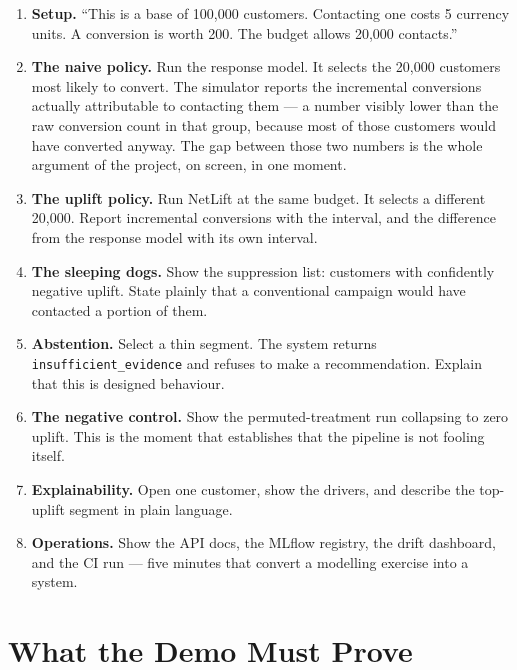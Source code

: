 \documentclass[11pt,a4paper]{article}
\begin{document}
\begin{enumerate}
\item \textbf{Setup.} ``This is a base of 100{,}000 customers. Contacting one costs 5 currency
units. A conversion is worth 200. The budget allows 20{,}000 contacts.''
\item \textbf{The naive policy.} Run the response model. It selects the 20{,}000 customers most
likely to convert. The simulator reports the incremental conversions actually attributable to
contacting them --- a number visibly lower than the raw conversion count in that group, because most
of those customers would have converted anyway. The gap between those two numbers is the whole
argument of the project, on screen, in one moment.
\item \textbf{The uplift policy.} Run NetLift at the same budget. It selects a different 20{,}000.
Report incremental conversions with the interval, and the difference from the response model with
its own interval.
\item \textbf{The sleeping dogs.} Show the suppression list: customers with confidently negative
uplift. State plainly that a conventional campaign would have contacted a portion of them.
\item \textbf{Abstention.} Select a thin segment. The system returns
\texttt{insufficient\_evidence} and refuses to make a recommendation. Explain that this is
designed behaviour.
\item \textbf{The negative control.} Show the permuted-treatment run collapsing to zero uplift.
This is the moment that establishes that the pipeline is not fooling itself.
\item \textbf{Explainability.} Open one customer, show the drivers, and describe the top-uplift
segment in plain language.
\item \textbf{Operations.} Show the API docs, the MLflow registry, the drift dashboard, and the CI
run --- five minutes that convert a modelling exercise into a system.
\end{enumerate}

\section{What the Demo Must Prove}
\end{document}
